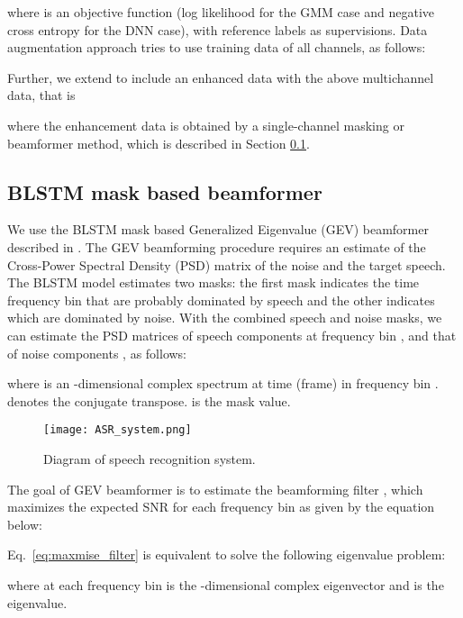 \documentclass[a4paper]{article}
\begin{document}
where  is an objective function (log likelihood for the GMM case and negative cross entropy for the DNN case), with reference labels as supervisions.
Data augmentation approach tries to use training data of all channels, as follows:


Further, we extend to include an enhanced data  with the above multichannel data, that is

where the enhancement data  is obtained by a single-channel masking or beamformer method, which is described in Section \ref{sec:blstm}.

\subsection{BLSTM mask based beamformer}
\label{sec:blstm}
We use the BLSTM mask based Generalized Eigenvalue (GEV) beamformer described in \cite{nn-gev}. The GEV beamforming procedure requires an estimate of the Cross-Power Spectral Density (PSD) matrix of the noise and the target speech. The BLSTM model estimates two masks: the first mask indicates the time frequency bin that are probably dominated by speech and the other indicates which are dominated by noise. 
With the combined speech and noise masks, we can estimate the PSD matrices of speech components  at frequency bin , and that of noise components , as follows:

where  is an -dimensional complex spectrum at time (frame)  in frequency bin .
 denotes the conjugate transpose.
 is the mask value.

\begin{figure}[t]
  \centering
  \texttt{[image: ASR\_system.png]}
  \caption{Diagram of speech recognition system.}
  \label{fig:speech_sys}
\end{figure}

The goal of GEV beamformer \cite{warsitz2007blind} is to estimate the beamforming filter , which maximizes the expected SNR for each frequency bin  as given by the equation below:

Eq.~\eqref{eq:maxmise_filter} is equivalent to solve the following eigenvalue problem:

where  at each frequency bin  is the -dimensional complex eigenvector and  is the eigenvalue. 
\end{document}
